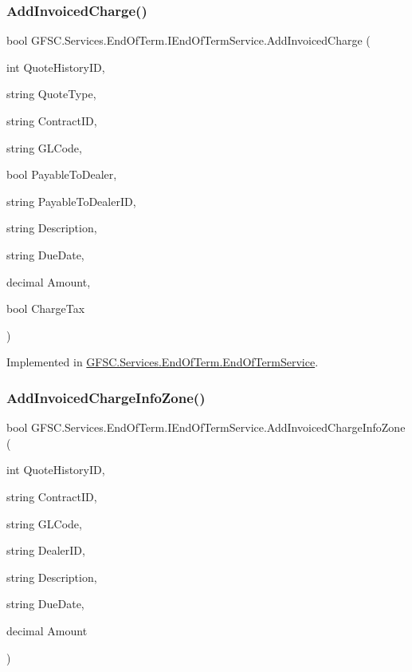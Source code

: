 \subsubsection{\texorpdfstring{Add\+Invoiced\+Charge()}{AddInvoicedCharge()}}
{\footnotesize\ttfamily bool G\+F\+S\+C.\+Services.\+End\+Of\+Term.\+I\+End\+Of\+Term\+Service.\+Add\+Invoiced\+Charge (\begin{DoxyParamCaption}\item[{int}]{Quote\+History\+ID,  }\item[{string}]{Quote\+Type,  }\item[{string}]{Contract\+ID,  }\item[{string}]{G\+L\+Code,  }\item[{bool}]{Payable\+To\+Dealer,  }\item[{string}]{Payable\+To\+Dealer\+ID,  }\item[{string}]{Description,  }\item[{string}]{Due\+Date,  }\item[{decimal}]{Amount,  }\item[{bool}]{Charge\+Tax }\end{DoxyParamCaption})}



Implemented in \mbox{\hyperlink{class_g_f_s_c_1_1_services_1_1_end_of_term_1_1_end_of_term_service_a0fa838b19293a8dfdfe4a447088c3420}{G\+F\+S\+C.\+Services.\+End\+Of\+Term.\+End\+Of\+Term\+Service}}.

\mbox{\label{interface_g_f_s_c_1_1_services_1_1_end_of_term_1_1_i_end_of_term_service_a7f613b68af6aba960e113b1d272450ff}} 
\subsubsection{\texorpdfstring{Add\+Invoiced\+Charge\+Info\+Zone()}{AddInvoicedChargeInfoZone()}}
{\footnotesize\ttfamily bool G\+F\+S\+C.\+Services.\+End\+Of\+Term.\+I\+End\+Of\+Term\+Service.\+Add\+Invoiced\+Charge\+Info\+Zone (\begin{DoxyParamCaption}\item[{int}]{Quote\+History\+ID,  }\item[{string}]{Contract\+ID,  }\item[{string}]{G\+L\+Code,  }\item[{string}]{Dealer\+ID,  }\item[{string}]{Description,  }\item[{string}]{Due\+Date,  }\item[{decimal}]{Amount }\end{DoxyParamCaption})}



